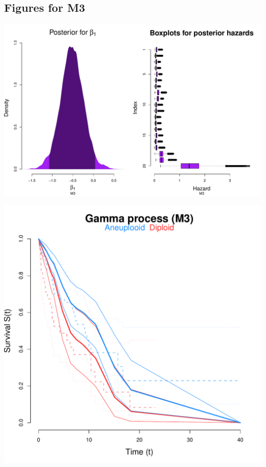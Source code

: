 \documentclass[12pt]{article}
\begin{document}
\subsection*{Figures for M3}
\begin{center}
\includegraphics[scale=0.60]{figs/m3_post.pdf}
\bigskip
\bigskip

\includegraphics[scale=0.45]{figs/m3_surv.pdf}
\end{center}
\end{document}
